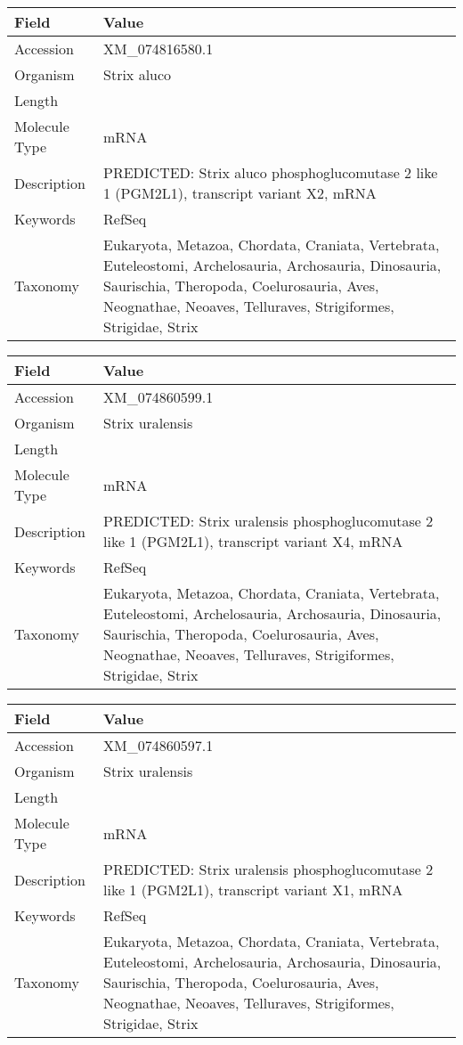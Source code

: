 \documentclass[10pt]{article}
\begin{document}
\vspace{1em}
{\footnotesize
\begin{longtable}{>{\raggedright\arraybackslash}p{4.5cm} >{\raggedright\arraybackslash}p{11.5cm}}
\textbf{Field} & \textbf{Value} \\
\hline
Accession & XM\_074816580.1 \\
Organism & Strix aluco \\
Length & 6281 \\
Molecule Type & mRNA \\
Description & PREDICTED: Strix aluco phosphoglucomutase 2 like 1 (PGM2L1), transcript variant X2, mRNA \\
Keywords & RefSeq \\
Taxonomy & Eukaryota, Metazoa, Chordata, Craniata, Vertebrata, Euteleostomi, Archelosauria, Archosauria, Dinosauria, Saurischia, Theropoda, Coelurosauria, Aves, Neognathae, Neoaves, Telluraves, Strigiformes, Strigidae, Strix \\
\end{longtable}
}

\vspace{1em}
{\footnotesize
\begin{longtable}{>{\raggedright\arraybackslash}p{4.5cm} >{\raggedright\arraybackslash}p{11.5cm}}
\textbf{Field} & \textbf{Value} \\
\hline
Accession & XM\_074860599.1 \\
Organism & Strix uralensis \\
Length & 6323 \\
Molecule Type & mRNA \\
Description & PREDICTED: Strix uralensis phosphoglucomutase 2 like 1 (PGM2L1), transcript variant X4, mRNA \\
Keywords & RefSeq \\
Taxonomy & Eukaryota, Metazoa, Chordata, Craniata, Vertebrata, Euteleostomi, Archelosauria, Archosauria, Dinosauria, Saurischia, Theropoda, Coelurosauria, Aves, Neognathae, Neoaves, Telluraves, Strigiformes, Strigidae, Strix \\
\end{longtable}
}

\vspace{1em}
{\footnotesize
\begin{longtable}{>{\raggedright\arraybackslash}p{4.5cm} >{\raggedright\arraybackslash}p{11.5cm}}
\textbf{Field} & \textbf{Value} \\
\hline
Accession & XM\_074860597.1 \\
Organism & Strix uralensis \\
Length & 6475 \\
Molecule Type & mRNA \\
Description & PREDICTED: Strix uralensis phosphoglucomutase 2 like 1 (PGM2L1), transcript variant X1, mRNA \\
Keywords & RefSeq \\
Taxonomy & Eukaryota, Metazoa, Chordata, Craniata, Vertebrata, Euteleostomi, Archelosauria, Archosauria, Dinosauria, Saurischia, Theropoda, Coelurosauria, Aves, Neognathae, Neoaves, Telluraves, Strigiformes, Strigidae, Strix \\
\end{longtable}
}
\end{document}
